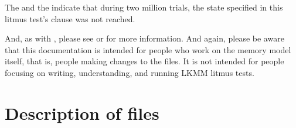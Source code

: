 The  and the  indicate
that during two million trials, the state specified in this litmus
test's  clause was not reached.

And, as with , please see  or
 for more information.
And again, please be aware that this documentation is intended for people
who work on the memory model itself, that is, people making changes to
the  files.
It is not intended for people focusing on writing, understanding, and
running LKMM litmus tests.

\section{Description of files}

